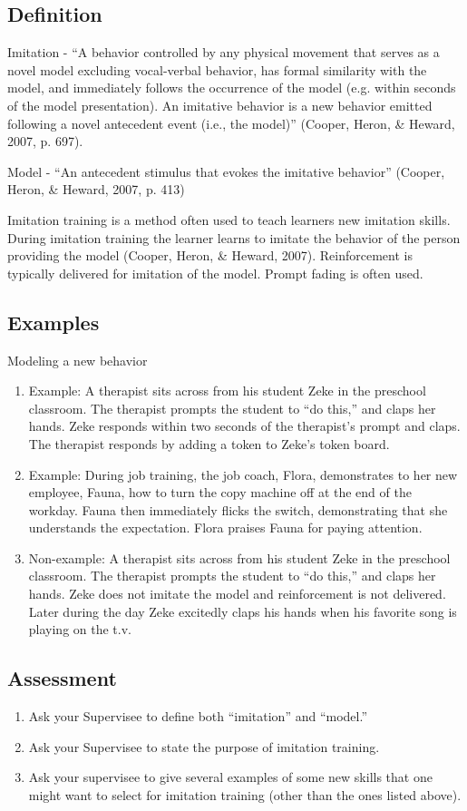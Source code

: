 \subsection{Definition}
Imitation - ``A behavior controlled by any physical movement that serves as a novel model excluding vocal-verbal behavior, has formal similarity with the model, and immediately follows the occurrence of the model (e.g. within seconds of the model presentation).  An imitative behavior is a new behavior emitted following a novel antecedent event (i.e., the model)'' (Cooper, Heron, \& Heward, 2007, p. 697).

Model - ``An antecedent stimulus that evokes the imitative behavior'' (Cooper, Heron, \& Heward, 2007, p. 413)

Imitation training is a method often used to teach learners new imitation skills.  During imitation training the learner learns to imitate the behavior of the person providing the model (Cooper, Heron, \& Heward, 2007). Reinforcement is typically delivered for imitation of the model. Prompt fading is often used.  

\subsection{Examples} Modeling a new behavior
\begin{enumerate}
\item Example: A therapist sits across from his student Zeke in the preschool classroom.  The therapist prompts the student to ``do this,'' and claps her hands.  Zeke responds within two seconds of the therapist's prompt and claps.  The therapist responds by adding a token to Zeke's token board.
\item Example:  During job training, the job coach, Flora, demonstrates to her new employee, Fauna, how to turn the copy machine off at the end of the workday.  Fauna then immediately flicks the switch, demonstrating that she understands the expectation.  Flora praises Fauna for paying attention.  
\item Non-example: A therapist sits across from his student Zeke in the preschool classroom.  The therapist prompts the student to ``do this,'' and claps her hands.  Zeke does not imitate the model and reinforcement is not delivered.  Later during the day Zeke excitedly claps his hands when his favorite song is playing on the t.v.
\end{enumerate}
%
\subsection{Assessment}
\begin{enumerate}
\item Ask your Supervisee to define both ``imitation'' and ``model.''
\item Ask your Supervisee to state the purpose of imitation training.
\item Ask your supervisee to give several examples of some new skills that one might want to select for imitation training (other than the ones listed above).
\end{enumerate}
%
